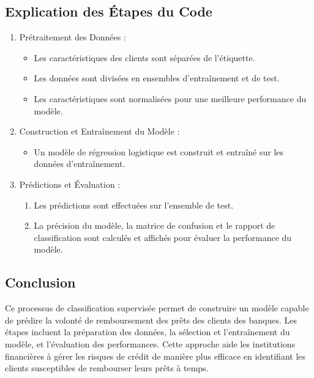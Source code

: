\documentclass[12pt,a4paper,openay]{book}
\numberwithin{equation}{chapter}
\begin{document}
		
		\subsection*{Explication des Étapes du Code}
		
		\begin{enumerate}
			\item Prétraitement des Donn\'ees :
			\begin{itemize}
				\item Les caract\'eristiques des clients sont s\'epar\'ees de l'\'etiquette.
				\item Les donn\'ees sont divis\'ees en ensembles d'entra\^inement et de test.
				\item Les caract\'eristiques sont normalis\'ees pour une meilleure performance du mod\`ele.
			\end{itemize}
			
			\item Construction et Entra\^inement du Mod\`ele :
			\begin{itemize}
				\item Un mod\`ele de r\'egression logistique est construit et entra\^in\'e sur les donn\'ees d'entra\^inement.
			\end{itemize}
			
			\item Pr\'edictions et Évaluation :
			\begin{enumerate}
				\item  Les pr\'edictions sont effectu\'ees sur l'ensemble de test.
				\item  La pr\'ecision du mod\`ele, la matrice de confusion et le rapport de classification sont calcul\'es et affich\'es pour \'evaluer la performance du mod\`ele.
			\end{enumerate}
		\end{enumerate}
	
	
	 \subsection*{Conclusion}
	
	Ce processus de classification supervis\'ee permet de construire un mod\`ele capable de pr\'edire la volont\'e de remboursement des pr\^ets des clients des banques. Les \'etapes incluent la pr\'eparation des donn\'ees, la s\'election et l'entra\^inement du mod\`ele, et l'\'evaluation des performances. Cette approche aide les institutions financi\`eres \`a g\'erer les risques de cr\'edit de mani\`ere plus efficace en identifiant les clients susceptibles de rembourser leurs pr\^ets \`a temps.
\end{document}
